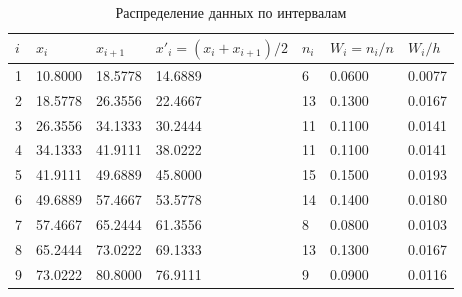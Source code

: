 \documentclass{article}
\theoremstyle{problemstyle}
\begin{document}
\begin{table}[H]
	\centering
	\begin{tabular}{|l|l|l|l|l|l|l|}
		\hline
		\(i\) & \(x_i\) & \(x_{i+1}\) & \(x'_i = (x_i + x_{i+1})/2\) & \(n_i\) & \(W_i = n_i/n\) & \(W_i/h\) \\
		\hline
		1     & 10.8000 & 18.5778     & 14.6889                      & 6       & 0.0600          & 0.0077    \\
		\hline
		2     & 18.5778 & 26.3556     & 22.4667                      & 13      & 0.1300          & 0.0167    \\
		\hline
		3     & 26.3556 & 34.1333     & 30.2444                      & 11      & 0.1100          & 0.0141    \\
		\hline
		4     & 34.1333 & 41.9111     & 38.0222                      & 11      & 0.1100          & 0.0141    \\
		\hline
		5     & 41.9111 & 49.6889     & 45.8000                      & 15      & 0.1500          & 0.0193    \\
		\hline
		6     & 49.6889 & 57.4667     & 53.5778                      & 14      & 0.1400          & 0.0180    \\
		\hline
		7     & 57.4667 & 65.2444     & 61.3556                      & 8       & 0.0800          & 0.0103    \\
		\hline
		8     & 65.2444 & 73.0222     & 69.1333                      & 13      & 0.1300          & 0.0167    \\
		\hline
		9     & 73.0222 & 80.8000     & 76.9111                      & 9       & 0.0900          & 0.0116    \\
		\hline
	\end{tabular}
	\caption{Распределение данных по интервалам}\label{table:intervals}
\end{table}
\end{document}
